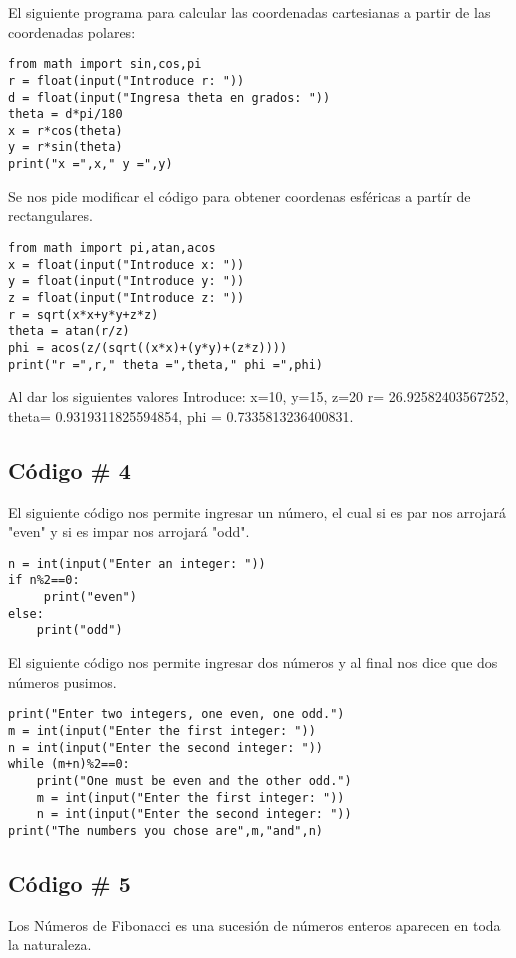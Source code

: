 \documentclass[12pt]{article}
\begin{document}
 El siguiente programa para calcular las coordenadas cartesianas a partir de las coordenadas polares: 
 
 \begin{verbatim}
from math import sin,cos,pi
r = float(input("Introduce r: "))
d = float(input("Ingresa theta en grados: "))
theta = d*pi/180
x = r*cos(theta)
y = r*sin(theta)
print("x =",x," y =",y)
\end{verbatim}

 Se nos pide modificar el código para obtener coordenas esféricas a partír de rectangulares.
 
 \begin{verbatim}
from math import pi,atan,acos
x = float(input("Introduce x: "))
y = float(input("Introduce y: "))
z = float(input("Introduce z: "))
r = sqrt(x*x+y*y+z*z)
theta = atan(r/z)
phi = acos(z/(sqrt((x*x)+(y*y)+(z*z))))
print("r =",r," theta =",theta," phi =",phi)
\end{verbatim}

Al dar los siguientes valores Introduce: x=10, y=15, z=20
r= 26.92582403567252, theta= 0.9319311825594854, phi = 0.7335813236400831.

\newpage
\subsection{Código \# 4}

El siguiente código nos permite ingresar un número, el cual si es par nos arrojará "even" y si es impar nos arrojará "odd".
\begin{verbatim}
n = int(input("Enter an integer: "))
if n%2==0:
     print("even")
else:
    print("odd")
\end{verbatim}

El siguiente código nos permite ingresar dos números y al final nos dice que dos números pusimos.

\begin{verbatim}
print("Enter two integers, one even, one odd.")
m = int(input("Enter the first integer: "))
n = int(input("Enter the second integer: "))
while (m+n)%2==0:
    print("One must be even and the other odd.")
    m = int(input("Enter the first integer: "))
    n = int(input("Enter the second integer: "))
print("The numbers you chose are",m,"and",n)
\end{verbatim}
\newpage
\subsection{Código \# 5}
 Los Números de Fibonacci  es una sucesión de números enteros aparecen en toda la naturaleza.  
\end{document}
